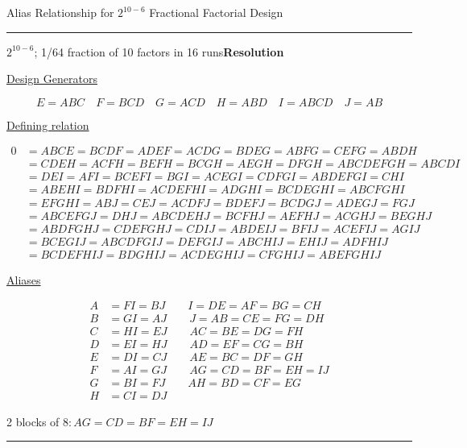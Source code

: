 \documentclass[11pt]{article}
\begin{document}
\begin{table}[h!]
\caption{Alias Relationship for $2^{10-6}$ Fractional Factorial Design}\label{tab:alias}
\vspace{-1.8ex}
\noindent\rule{\textwidth}{0.08em}
$2^{10-6}$; 1/64 fraction of 10 factors in 16 runs\hfill \textbf{Resolution \MakeUppercase{}}\\
\centerline{\underline{Design Generators}}
\[
E = ABC\quad F = BCD\quad G = ACD\quad H = ABD\quad I = ABCD\quad J = AB
\]
\centerline{\underline{Defining relation}}
\begin{align*}
0 &= ABCE = BCDF = ADEF = ACDG = BDEG = ABFG = CEFG = ABDH \\
  &= CDEH = ACFH = BEFH = BCGH = AEGH = DFGH = ABCDEFGH = ABCDI \\
  &= DEI = AFI = BCEFI = BGI = ACEGI = CDFGI = ABDEFGI = CHI \\
  &= ABEHI = BDFHI = ACDEFHI = ADGHI = BCDEGHI = ABCFGHI \\
  &= EFGHI = ABJ = CEJ = ACDFJ = BDEFJ = BCDGJ = ADEGJ = FGJ \\
  &= ABCEFGJ = DHJ = ABCDEHJ = BCFHJ = AEFHJ = ACGHJ = BEGHJ \\
  &= ABDFGHJ = CDEFGHJ = CDIJ = ABDEIJ = BFIJ = ACEFIJ = AGIJ \\
  &= BCEGIJ = ABCDFGIJ = DEFGIJ = ABCHIJ = EHIJ = ADFHIJ \\
  &= BCDEFHIJ = BDGHIJ = ACDEGHIJ = CFGHIJ = ABEFGHIJ    
\end{align*}
\centerline{\underline{Aliases}}
\begin{align*}
A &= FI = BJ\qquad I = DE = AF = BG = CH \\
B &= GI = AJ\qquad J = AB = CE = FG = DH \\
C &= HI = EJ\qquad AC = BE = DG = FH \\
D &= EI = HJ\qquad AD = EF = CG = BH \\
E &= DI = CJ\qquad AE = BC = DF = GH \\
F &= AI = GJ\qquad AG = CD = BF = EH = IJ \\
G &= BI = FJ\qquad AH = BD = CF = EG \\
H &= CI = DJ
\end{align*}\vspace{-1.8ex}
\centerline{2 blocks of 8:\,$AG = CD = BF = EH = IJ$}
\noindent\rule{\textwidth}{0.08em}
\end{table}
\end{document}

